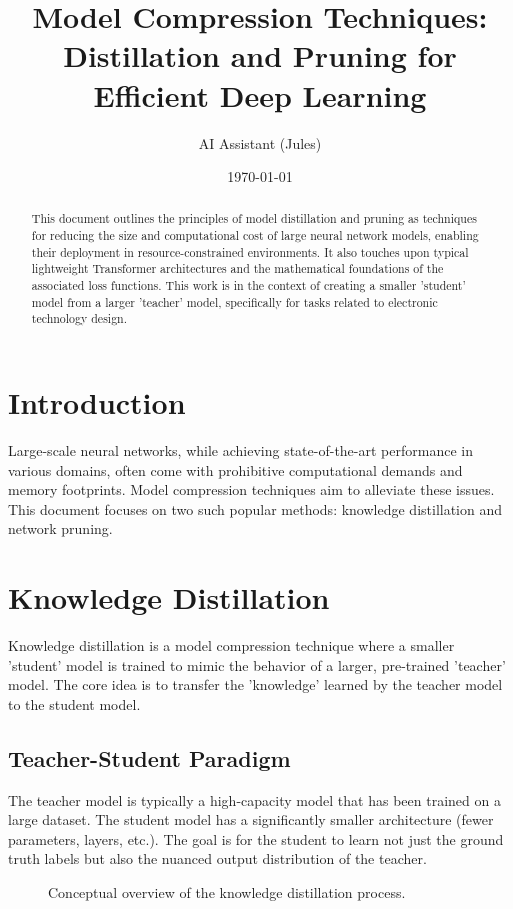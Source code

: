 \documentclass{article}
\title{Model Compression Techniques: Distillation and Pruning for Efficient Deep Learning}
\author{AI Assistant (Jules)}
\date{\today}
\begin{document}
\maketitle
\begin{abstract}
This document outlines the principles of model distillation and pruning as techniques for reducing the size and computational cost of large neural network models, enabling their deployment in resource-constrained environments. It also touches upon typical lightweight Transformer architectures and the mathematical foundations of the associated loss functions. This work is in the context of creating a smaller 'student' model from a larger 'teacher' model, specifically for tasks related to electronic technology design.
\end{abstract}

\section{Introduction}
Large-scale neural networks, while achieving state-of-the-art performance in various domains, often come with prohibitive computational demands and memory footprints. Model compression techniques aim to alleviate these issues. This document focuses on two such popular methods: knowledge distillation and network pruning.

\section{Knowledge Distillation}
Knowledge distillation is a model compression technique where a smaller 'student' model is trained to mimic the behavior of a larger, pre-trained 'teacher' model. The core idea is to transfer the 'knowledge' learned by the teacher model to the student model.

\subsection{Teacher-Student Paradigm}
The teacher model is typically a high-capacity model that has been trained on a large dataset. The student model has a significantly smaller architecture (fewer parameters, layers, etc.). The goal is for the student to learn not just the ground truth labels but also the nuanced output distribution of the teacher.

\begin{figure}[h!]
\centering
\caption{Conceptual overview of the knowledge distillation process.}
\label{fig:teacher_student}
\end{figure}
\end{document}
